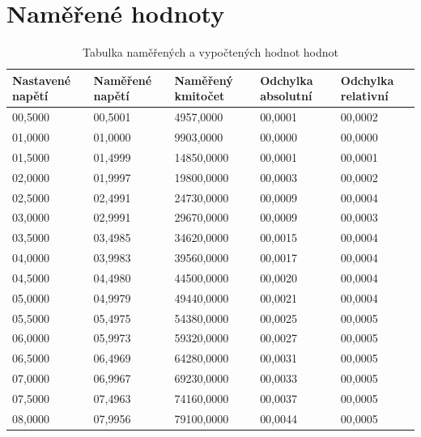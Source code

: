 \documentclass[a4paper,12pt]{article}   %
\begin{document}
\section{Naměřené hodnoty}
\label{chap:namerene_hodnoty}
\begin{table}[h!]
  \begin{tabular}{|l|l|l|l|l|}
  \hline
  Nastavené napětí & Naměřené napětí & Naměřený kmitočet & Odchylka absolutní & Odchylka relativní \\ \hline
  00,5000          & 00,5001         & 4957,0000         & 00,0001            & 00,0002            \\ \hline
  01,0000          & 01,0000         & 9903,0000         & 00,0000            & 00,0000            \\ \hline
  01,5000          & 01,4999         & 14850,0000        & 00,0001            & 00,0001            \\ \hline
  02,0000          & 01,9997         & 19800,0000        & 00,0003            & 00,0002            \\ \hline
  02,5000          & 02,4991         & 24730,0000        & 00,0009            & 00,0004            \\ \hline
  03,0000          & 02,9991         & 29670,0000        & 00,0009            & 00,0003            \\ \hline
  03,5000          & 03,4985         & 34620,0000        & 00,0015            & 00,0004            \\ \hline
  04,0000          & 03,9983         & 39560,0000        & 00,0017            & 00,0004            \\ \hline
  04,5000          & 04,4980         & 44500,0000        & 00,0020            & 00,0004            \\ \hline
  05,0000          & 04,9979         & 49440,0000        & 00,0021            & 00,0004            \\ \hline
  05,5000          & 05,4975         & 54380,0000        & 00,0025            & 00,0005            \\ \hline
  06,0000          & 05,9973         & 59320,0000        & 00,0027            & 00,0005            \\ \hline
  06,5000          & 06,4969         & 64280,0000        & 00,0031            & 00,0005            \\ \hline
  07,0000          & 06,9967         & 69230,0000        & 00,0033            & 00,0005            \\ \hline
  07,5000          & 07,4963         & 74160,0000        & 00,0037            & 00,0005            \\ \hline
  08,0000          & 07,9956         & 79100,0000        & 00,0044            & 00,0005            \\ \hline
  \end{tabular}
  \caption{Tabulka naměřených a vypočtených hodnot hodnot}
  \label{namhod}
  \end{table}
\end{document}
